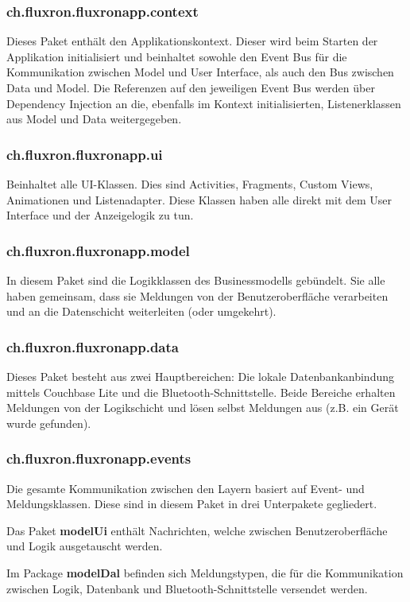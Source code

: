 \subsubsection{ch.fluxron.fluxronapp.context}
Dieses Paket enthält den Applikationskontext. Dieser wird beim Starten der Applikation initialisiert und beinhaltet sowohle den Event Bus für die Kommunikation zwischen Model und User Interface, als auch den Bus zwischen Data und Model. Die Referenzen auf den jeweiligen Event Bus werden über Dependency Injection an die, ebenfalls im Kontext initialisierten, Listenerklassen aus Model und Data weitergegeben.

\subsubsection{ch.fluxron.fluxronapp.ui}
Beinhaltet alle UI-Klassen. Dies sind Activities, Fragments, Custom Views, Animationen und Listenadapter. Diese Klassen haben alle direkt mit dem User Interface und der Anzeigelogik zu tun.

\subsubsection{ch.fluxron.fluxronapp.model}
In diesem Paket sind die Logikklassen des Businessmodells gebündelt. Sie alle haben gemeinsam, dass sie Meldungen von der Benutzeroberfläche verarbeiten und an die Datenschicht weiterleiten (oder umgekehrt).

\subsubsection{ch.fluxron.fluxronapp.data}
Dieses Paket besteht aus zwei Hauptbereichen: Die lokale Datenbankanbindung mittels Couchbase Lite und die Bluetooth-Schnittstelle. Beide Bereiche erhalten Meldungen von der Logikschicht und lösen selbst Meldungen aus (z.B. ein Gerät wurde gefunden).

\subsubsection{ch.fluxron.fluxronapp.events}
Die gesamte Kommunikation zwischen den Layern basiert auf Event- und Meldungsklassen. Diese sind in diesem Paket in drei Unterpakete gegliedert.

Das Paket \textbf{modelUi} enthält Nachrichten, welche zwischen Benutzeroberfläche und Logik ausgetauscht werden.

Im Package \textbf{modelDal} befinden sich Meldungstypen, die für die Kommunikation zwischen Logik, Datenbank und Bluetooth-Schnittstelle versendet werden.

